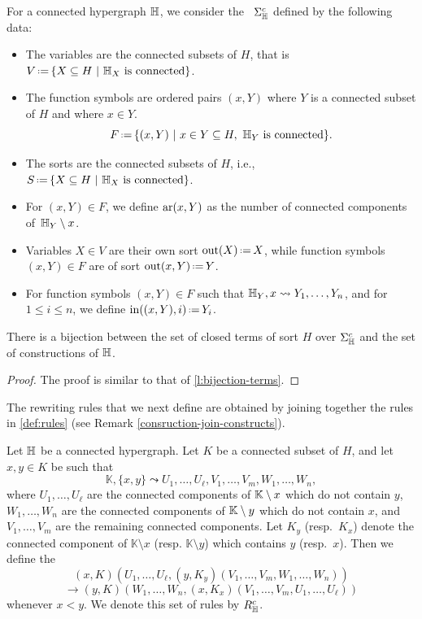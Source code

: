 \begin{definition}
  For a connected hypergraph ${\mathbb H}$, we consider the ~$\Sigma_{\mathbb H}^c$ defined by the following data:
 \begin{itemize}
    \item The variables are the connected subsets of $H$, that is $V\eqdef \{ X \subseteq H \ | \ \hyper{H}_{X} \text{ is connected}\}$. 
    \item The function symbols are ordered pairs $(x,Y)$ where $Y$ is a connected subset of $H$ and where $x\in Y$.
    $$F\eqdef \{(x,Y) \ | \ x \in Y \subseteq H, \ \hyper{H}_Y \text{ is connected}\}.$$
    \item The sorts are the connected subsets of $H$, i.e., 
    $S\eqdef \{ X \subseteq H \ | \ \hyper{H}_X \text{ is connected}\}$.
    \item For $(x,Y) \in F$, we define $\mathrm{ar}(x,Y)$ as the number of connected components of~${\mathbb H}_Y\setminus {x}$.
    \item Variables $X \in V$ are their own sort $\outsort(X)\eqdef X$, while function symbols~$(x,Y) \in F$ are of sort $\outsort(x,Y)\eqdef Y$.
    \item For function symbols $(x,Y) \in F$ such that ${\mathbb H}_Y,x \leadsto Y_1,\ldots,Y_n$, and for $1 \leq i \leq n$, we define $\insort((x,Y),i)\eqdef Y_i$.
  \end{itemize}
\end{definition}

\begin{lemma} 
  \label{l:bijection-constructions}
  There is a bijection between the set of closed terms of  sort $H$ over $\Sigma_{\mathbb H}^c$ and the set of constructions of ${\mathbb H}$.
\end{lemma}

\begin{proof}
  The proof is similar to that of \cref{l:bijection-terms}.
\end{proof}

The rewriting rules that we next define are obtained by joining together the rules in \cref{def:rules} (see Remark \ref{consruction-join-constructs}). 

\begin{definition} 
  \label{def:rules-2}
  Let ${\mathbb H}$ be a connected hypergraph. 
  Let $K$ be a connected subset of $H$, and let $x,y \in K$ be such that
  $$\mathbb{K},\{x,y\} \leadsto U_1,\ldots,U_\ell,V_1,\ldots,V_m,W_1,\ldots,W_n,$$
  where $U_1,\ldots,U_\ell$ are the connected components of ${\mathbb K} \setminus x$ which do not contain $y$, $W_1,\ldots,W_n$ are the connected components of ${\mathbb K} \setminus y$ which do not contain $x$, and $V_1,\ldots,V_m$ are the remaining connected components. 
  Let $K_y$ (resp.\ $K_x$) denote the connected component of $\mathbb{K} \setminus x$ (resp. $\mathbb{K} \setminus y$) which contains $y$ (resp.\ $x$).
  Then we define the 
  $$(x,K)(U_1,\ldots, U_{\ell},(y,K_y)(V_1,\ldots,V_m,W_1,\ldots,W_n))$$
  $$ \longrightarrow (y,K)(W_1,\ldots,W_n,(x,K_x)(V_1,\ldots,V_m,U_1,\ldots,U_\ell))$$
  whenever $x < y$. 
  We denote this set of rules by $R_{\mathbb H}^c$.
\end{definition} 

